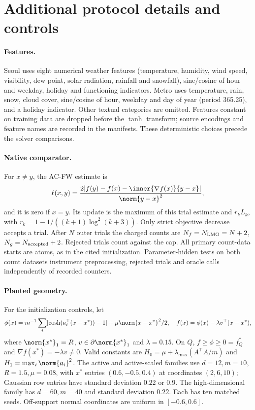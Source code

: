 \section{Additional protocol details and controls}
\label{app:protocol}
\paragraph{Features.}
Seoul uses eight numerical weather features (temperature, humidity,
wind speed, visibility, dew point, solar radiation, rainfall and snowfall),
sine/cosine of hour and weekday, holiday and functioning indicators.
Metro uses temperature, rain, snow, cloud cover, sine/cosine of hour,
weekday and day of year (period 365.25), and a holiday indicator.
Other textual categories are omitted. Features constant on training
data are dropped before the $\tanh$ transform; source encodings and
feature names are recorded in the manifests. These deterministic
choices precede the solver comparisons.

\paragraph{Native comparator.}
For $x\ne y$, the AC-FW estimate is
\[
 \ell(x,y)=\frac{2|f(y)-f(x)-\inner{\nabla f(x)}{y-x}|}{\norm{y-x}^2},
\]
and it is zero if $x=y$. Its update is the maximum of this trial estimate
and $r_kL_k$, with $r_k=1-1/((k+1)\log^2(k+3))$.
Only strict objective decrease accepts a trial.
After $N$ outer trials the charged counts are
$N_f=N_{\rm LMO}=N+2$, $N_g=N_{\rm accepted}+2$.
Rejected trials count against the cap. All primary count-data starts
are atoms, as in the cited initialization. Parameter-hidden tests on
both count datasets instrument preprocessing, rejected trials and
oracle calls independently of recorded counters.

\paragraph{Planted geometry.}
For the initialization controls, let
\[
 \phi(x)=m^{-1}\sum_i[\cosh(a_i^\top(x-x^*))-1]
                         +\mu\norm{x-x^*}^2/2,
 \quad f(x)=\phi(x)-\lambda v^\top(x-x^*),
\]
where $\norm{x^*}_1=R$, $v\in\partial\norm{x^*}_1$ and
$\lambda=0.15$. On $Q$, $f\ge\phi\ge0=f_Q^*$ and
$\nabla f(x^*)=-\lambda v\ne0$. Valid constants are
$H_0=\mu+\lambda_{\max}(A^\top A/m)$ and
$H_1=\max_i\norm{a_i}^2$.
The active and active-scaled families use $d=12,m=10$,
$R=1.5,\mu=0.08$, with $x^*$ entries $(0.6,-0.5,0.4)$ at
coordinates $(2,6,10)$; Gaussian row entries have standard deviation
$0.22$ or $0.9$. The high-dimensional family has $d=60,m=40$
and standard deviation $0.22$. Each has ten matched seeds.
Off-support normal coordinates are uniform in $[-0.6,0.6]$.

